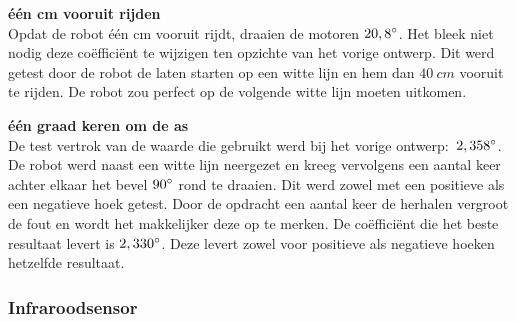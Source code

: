 \documentclass[tt3]{penoverslag}
\begin{document}
\begin{description}
\item \textbf{\'e\'en cm vooruit rijden}\\
Opdat de robot \'e\'en cm vooruit rijdt, draaien de motoren $20,8\degree$. Het bleek niet nodig deze co\"effici\"ent te wijzigen ten opzichte van het vorige ontwerp. Dit werd getest door de robot de laten starten op een witte lijn en hem dan $40~cm$ vooruit te rijden. De robot zou perfect op de volgende witte lijn moeten uitkomen.


\item \textbf{\'e\'en graad keren om de as}\\
De test vertrok van de waarde die gebruikt werd bij het vorige ontwerp:~$2,358\degree$. De robot werd naast een witte lijn neergezet en kreeg vervolgens een aantal keer achter elkaar het bevel $90\degree$ rond te draaien. Dit werd zowel met een positieve als een negatieve hoek getest. Door de opdracht een aantal keer de herhalen vergroot de fout en wordt het makkelijker deze op te merken.
De co\"effici\"ent die het beste resultaat levert is $2,330\degree$. Deze levert zowel voor positieve als negatieve hoeken hetzelfde resultaat.


\end{description}

\subsubsection{Infraroodsensor}
\end{document}
